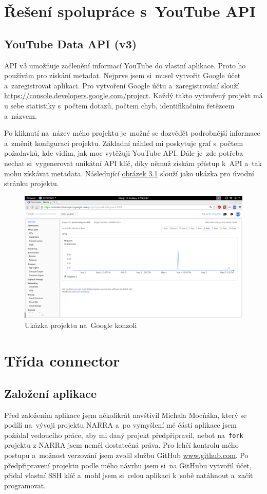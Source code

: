 \section{Řešení spolupráce s~YouTube API}
\subsection{YouTube Data API (v3)}
\par API v3\cite{apiv3} umožňuje začlenění informací YouTube do vlastní aplikace. Proto ho používám pro získání metadat. Nejprve jsem si~musel vytvořit Google účet a~zaregistrovat aplikaci. Pro vytvoření Google účtu a~zaregistrování slouží \url{https://console.developers.google.com/project}\cite{googleconsole}. Každý takto vytvořený projekt má u sebe statistiky s~počtem dotazů, počtem chyb, identifikačním řetězcem a~názvem. 
\par Po kliknutí na~název mého projektu je~možné se dozvědět podrobnější informace a~změnit konfiguraci projektu. Základní náhled mi poskytuje graf s~počtem požadavků, kde vidím, jak moc vytěžuji YouTube API\cite{apiv3}. Dále je~zde potřeba nechat si~vygenerovat unikátní API klíč, díky němuž získám přístup k~API a~tak mohu získávat metadata. Následující \hyperlink{consolesample}{obrázek 3.1} slouží jako ukázka pro úvodní stránku projektu.
\begin{figure}[h!]
	\hypertarget{consolesample}{}
	\centering
	\includegraphics[width=\textwidth]{obrazova_priloha/my_projekt.png}
	\caption{Ukázka projektu na~Google konzoli}
\end{figure}

\section{Třída connector}
\subsection{Založení aplikace}
\par Před založením aplikace jsem několikrát navštívil Michala Mocňáka, který se podílí na~vývoji projektu NARRA a~po vymyšlení mé části aplikace jsem požádal vedoucího práce, aby mi daný projekt předpřipravil, neboť na~\texttt{fork} projektu z NARRA jsem neměl dostatečná práva. Pro lehčí kontrolu mého postupu a~možnost verzování jsem zvolil službu GitHub \url{www.github.com}\cite{git}. Po předpřipravení projektu podle mého návrhu jsem si~na GitHubu vytvořil účet, přidal vlastní SSH klíč a~mohl jsem si~celou aplikaci k~sobě natáhnout a~začít programovat.

